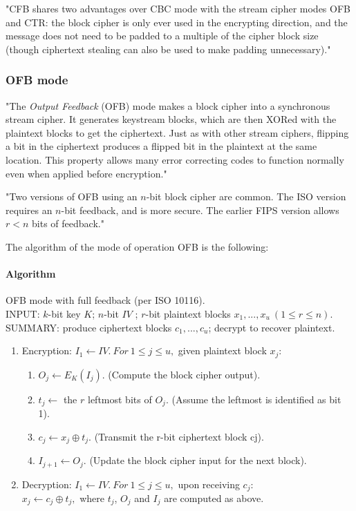 \documentclass[a4paper,12pt,titlepage]{article}
\begin{document}
"CFB shares two advantages over CBC mode with the stream cipher modes OFB and CTR: the block cipher is only ever used in the encrypting direction, and the message does not need to be padded to a multiple of the cipher block size (though ciphertext stealing can also be used to make padding unnecessary)." \citep{wiki:mode-operation}

\subsubsection{OFB mode}

"The \textit{Output Feedback} (OFB) mode makes a block cipher into a synchronous stream cipher. It generates keystream blocks, which are then XORed with the plaintext blocks to get the ciphertext. Just as with other stream ciphers, flipping a bit in the ciphertext produces a flipped bit in the plaintext at the same location. This property allows many error correcting codes to function normally even when applied before encryption." \citep{wiki:mode-operation}

"Two versions of OFB using an $n$-bit block cipher are common. The ISO version requires an $n$-bit feedback, and is more secure. The earlier FIPS version allows $r < n$ bits of feedback." \citep{menezes_handbook_1996}

The algorithm of the mode of operation OFB is the following:

\paragraph{Algorithm}
OFB mode with full feedback (per ISO 10116). \citep{menezes_handbook_1996} \\
INPUT: $k$-bit key $K$; $n$-bit $IV$ ; $r$-bit plaintext blocks $x_1, ... , x_u\ (1 \le r \le n)$. \\
SUMMARY: produce ciphertext blocks $c_1, ... , c_u$; decrypt to recover plaintext.
\begin{enumerate}[noitemsep]
\item Encryption: $I_1 \leftarrow IV.\ For\ 1 \le j \le u,$ given plaintext block $x_j$:
	\begin{enumerate}
	\item $O_j \leftarrow E_K(I_j).$ (Compute the block cipher output).
	\item $t_j \leftarrow$ the $r$ leftmost bits of $O_j$. (Assume the leftmost is identified as bit 1).
	\item $c_j \leftarrow x_j \oplus t_j.$ (Transmit the r-bit ciphertext block cj).
	\item $I_{j+1} \leftarrow O_j.$ (Update the block cipher input for the next block).
	\end{enumerate}
\item Decryption: $I_1 \leftarrow IV.\ For\ 1 \le j \le u,$ upon receiving $c_j$:\\
$x_j \leftarrow c_j \oplus t_j,$ where $t_j$, $O_j$ and $I_j$ are computed as above.
\end{enumerate}
\end{document}
